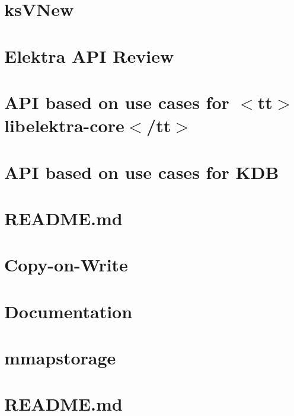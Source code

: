 \let\mypdfximage\pdfximage\def\pdfximage{\immediate\mypdfximage}\documentclass[twoside]{book}
\newcommand{\+}{\discretionary{\mbox{\scriptsize$\hookleftarrow$}}{}{}}
\begin{document}
\chapter{ks\+VNew}
\label{doc_contrib_api_reviews_core_ksVNew_md}

\chapter{Elektra API Review}
\label{doc_contrib_api_reviews_README_md}

\chapter{API based on use cases for $<$tt$>$libelektra-\/core$<$/tt$>$}
\label{doc_contrib_api_usecases_core_md}

\chapter{API based on use cases for KDB}
\label{doc_contrib_api_usecases_kdb_md}

\chapter{README.\+md}
\label{doc_contrib_api_usecases_README_md}

\chapter{Copy-\/on-\/\+Write}
\label{doc_contrib_copy_on_write_md}

\chapter{Documentation}
\label{doc_contrib_documentation_md}

\chapter{mmapstorage}
\label{doc_contrib_mmapstorage_md}

\chapter{README.\+md}
\label{doc_contrib_README_md}

\end{document}
